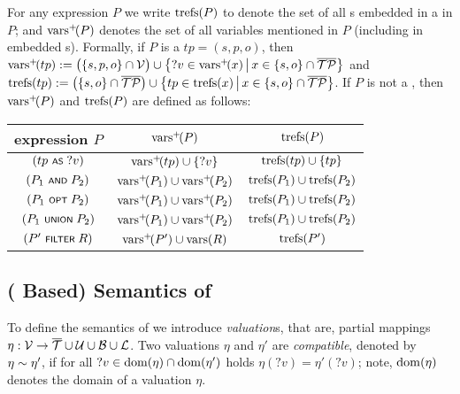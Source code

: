 \noindent
For any {\SPARQLplus} expression $P$ we write $\mathrm{trefs}(P)$ to denote the set of all {\TPplus}s embedded in a {\TPplus} in $P$; and $\mathrm{vars}^+\!(P)$ denotes the set of all variables mentioned in $P$ (including in embedded {\TPplus}s). Formally, if $P$ is a {\TPplus} $tp \!=\! (s,p,o)$,
then $\mathrm{vars}^+\!(tp) := \bigl( \lbrace s,p,o \rbrace \cap \mathcal{V} \bigr) \cup \big\lbrace ?v \in \mathrm{vars}^+\!(x) \,\big|\, x \in \lbrace s,o \rbrace \cap \overline{\mathcal{TP}} \big\rbrace$
and $\mathrm{trefs}(tp) := \bigl( \lbrace s,o \rbrace \cap \overline{\mathcal{TP}} \bigr) \cup \big\lbrace tp \in \mathrm{trefs}(x) \,\big|\, x \in \lbrace s,o \rbrace \cap \overline{\mathcal{TP}} \big\rbrace$.
If $P$ is not a {\TPplus}, then $\mathrm{vars}^+\!(P)$ and $\mathrm{trefs}(P)$ are defined as follows:
	\par \vspace{1pt}
	\parbox{0.95\linewidth}{\centering
		\begin{tabular}{|c||c|c|} \hline
			{\SPARQLplus} expression $P$ &
			$\mathrm{vars}^+\!(P)$ &
			$\mathrm{trefs}(P)$
			\\ \hline
			\hline
			$(tp \text{ \normalfont\scriptsize\textsf{AS} } ?v)$ &
			$\mathrm{vars}^+\!(tp) \cup \lbrace ?v \rbrace$ &
			$\mathrm{trefs}(tp) \cup \lbrace tp \rbrace$
			\\ \hline
			$(P_1 \text{ \normalfont\scriptsize\textsf{AND} } P_2)$ &
			$\mathrm{vars}^+\!(P_1) \cup \mathrm{vars}^+\!(P_2)$ &
			$\mathrm{trefs}(P_1) \cup \mathrm{trefs}(P_2)$
			\\ \hline
			$(P_1 \text{ \normalfont\scriptsize\textsf{OPT} } P_2)$ &
			$\mathrm{vars}^+\!(P_1) \cup \mathrm{vars}^+\!(P_2)$ &
			$\mathrm{trefs}(P_1) \cup \mathrm{trefs}(P_2)$
			\\ \hline
			$(P_1 \text{ \normalfont\scriptsize\textsf{UNION} } P_2)$ &
			$\mathrm{vars}^+\!(P_1) \cup \mathrm{vars}^+\!(P_2)$ &
			$\mathrm{trefs}(P_1) \cup \mathrm{trefs}(P_2)$
			\\ \hline
			$(P' \text{ \normalfont\scriptsize\textsf{FILTER} } R)$ &
			$\mathrm{vars}^+\!(P') \cup \mathrm{vars}(R)$ &
			$\mathrm{trefs}(P')$
			\\ \hline
		\end{tabular}
	}
	\par


\subsection{({\RDFplus} Based) Semantics of {\SPARQLplus}}
To define the semantics of {\SPARQLplus} we introduce \emph{valuation}s, that are, partial mappings $\eta : \mathcal{V} \rightarrow \overline{\mathcal{T}} \cup \mathcal{U} \cup \mathcal{B} \cup \mathcal{L}$.
Two valuations $\eta$ and $\eta'$ are \emph{compatible}, denoted by $\eta \sim \eta'$, if for all $?v \in \mathrm{dom}(\eta) \cap \mathrm{dom}(\eta')$ holds $\eta(?v) = \eta'(?v)$; note, $\mathrm{dom}(\eta)$ denotes the domain of a valuation $\eta$.

